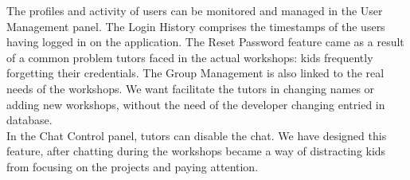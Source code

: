 The profiles and activity of users can be monitored and managed in the User Management panel. The Login History comprises the timestamps of the users having logged in on the application. The Reset Password feature came as a result of a common problem tutors faced in the actual workshops: kids frequently forgetting their credentials. The Group Management is also linked to the real needs of the workshops. We want facilitate the tutors in changing names or adding new workshops, without the need of the developer changing entried in database. \\

In the Chat Control panel, tutors can disable the chat. We have designed this feature, after chatting during the workshops became a way of distracting kids from focusing on the projects and paying attention. 






















